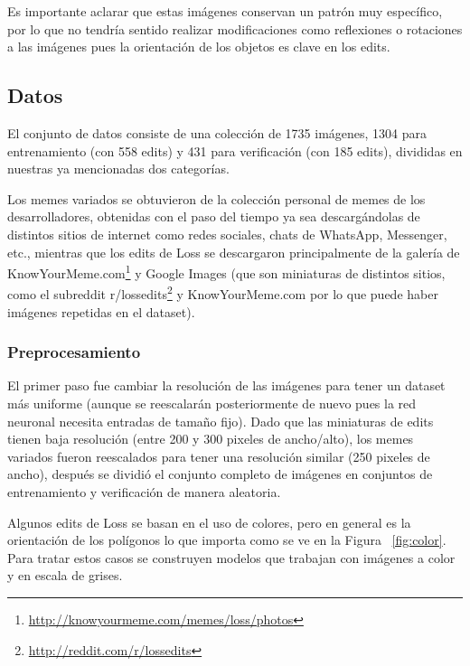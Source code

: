 \documentclass[spanish,11pt,letterpaper]{article}
\begin{document}
Es importante aclarar que estas imágenes conservan un patrón muy específico, por
lo que no tendría sentido realizar modificaciones como reflexiones o rotaciones
a las imágenes pues la orientación de los objetos es clave en los edits.

\subsection{Datos}

El conjunto de datos consiste de una colección de 1735 imágenes, 1304 para
entrenamiento (con 558 edits) y 431 para verificación (con 185 edits), divididas
en nuestras ya mencionadas dos categorías.

Los memes variados se obtuvieron de la colección personal de memes de los
desarrolladores, obtenidas con el paso del tiempo ya sea descargándolas de
distintos sitios de internet como redes sociales, chats de WhatsApp, Messenger,
etc., mientras que los edits de Loss se descargaron principalmente de la galería
de \textsf{KnowYourMeme.com}\footnote{\url{http://knowyourmeme.com/memes/loss/photos}} y
\textsf{Google Images} (que son miniaturas de distintos sitios, como el subreddit
\textsf{r/lossedits}\footnote{\url{http://reddit.com/r/lossedits}} y
\textsf{KnowYourMeme.com} por lo que puede haber imágenes repetidas en el dataset).

\subsubsection{Preprocesamiento}

El primer paso fue cambiar la resolución de las imágenes para tener un dataset
más uniforme (aunque se reescalarán posteriormente de nuevo pues la red neuronal
necesita entradas de tamaño fijo). Dado que las miniaturas de edits tienen baja
resolución (entre 200 y 300 pixeles de ancho/alto), los memes variados fueron
reescalados para tener una resolución similar (250 pixeles de ancho), después se
dividió el conjunto completo de imágenes en conjuntos de entrenamiento y
verificación de manera aleatoria.

Algunos edits de Loss se basan en el uso de colores, pero en general es la
orientación de los polígonos lo que importa como se ve en la Figura ~\ref{fig:color}.
Para tratar estos casos se construyen modelos que trabajan con imágenes a color
y en escala de grises.
\end{document}
